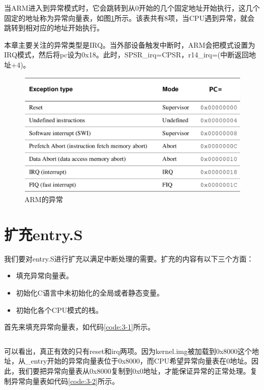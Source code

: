 \documentclass[main.tex]{subfiles}
\begin{document}
\begin{CJK*}{UTF8}{song}
当ARM进入到异常模式时，它会跳转到从0开始的几个固定地址开始执行，这几个固定的地址称为异常向量表，如图\ref{figure:3-2}所示。该表共有8项，当CPU遇到异常，就会跳转到相对应的地址开始执行。

\par
本章主要关注的异常类型是IRQ。当外部设备触发中断时，ARM会把模式设置为IRQ模式，然后将pc设为0x18。此时，SPSR\_irq=CPSR，r14\_irq=(中断返回地址+4)。

\begin{figure}[htp]
\centering
\includegraphics[scale=0.35]{figures/3-2.png}
\caption{ARM的异常}
\label{figure:3-2}
\end{figure}

\section{扩充entry.S}
我们要对entry.S进行扩充以满足中断处理的需要。扩充的内容有以下三个方面：
\begin{itemize}
\item 填充异常向量表。
\item 初始化C语言中未初始化的全局或者静态变量。
\item 初始化各个CPU模式的栈。
\end{itemize}

首先来填充异常向量表，如代码\ref{code:3-1}所示。

\begin{code}
\label{code:3-1}
\inputminted[firstline=71,lastline=104,linenos,numbersep=5pt,frame=lines,framesep=2mm]{gas}{src/chapter03/kernel/entry.S}
\end{code}

可以看出，真正有效的只有reset和irq两项。因为kernel.img被加载到0x8000这个地址，从\_entry开始的异常向量表位于0x8000，而CPU希望异常向量表在0地址。因此，我们要把异常向量表从0x8000复制到0x0地址，才能保证异常的正常处理。复制异常向量表如代码\ref{code:3-2}所示。


\end{CJK*}
\end{document}
